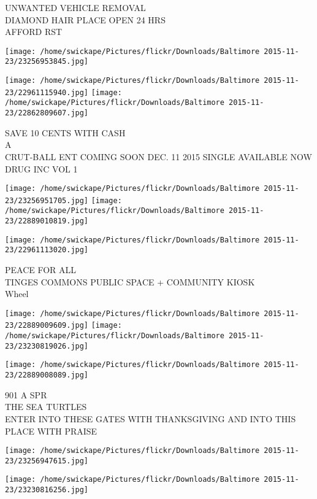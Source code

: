 \documentclass[10pt,letterpaper]{article}
\begin{document}
UNWANTED VEHICLE REMOVAL\\
DIAMOND HAIR PLACE OPEN 24 HRS\\
AFFORD RST\\
\pagebreak

\texttt{[image: /home/swickape/Pictures/flickr/Downloads/Baltimore 2015-11-23/23256953845.jpg]}

\vspace{0.25in}
\texttt{[image: /home/swickape/Pictures/flickr/Downloads/Baltimore 2015-11-23/22961115940.jpg]}
\texttt{[image: /home/swickape/Pictures/flickr/Downloads/Baltimore 2015-11-23/22862809607.jpg]}

SAVE 10 CENTS WITH CASH\\
A\\
CRUT{-}BALL ENT COMING SOON DEC. 11 2015 SINGLE AVAILABLE NOW DRUG INC VOL 1\\
\pagebreak

\texttt{[image: /home/swickape/Pictures/flickr/Downloads/Baltimore 2015-11-23/23256951705.jpg]}
\texttt{[image: /home/swickape/Pictures/flickr/Downloads/Baltimore 2015-11-23/22889010819.jpg]}

\vspace{0.25in}
\texttt{[image: /home/swickape/Pictures/flickr/Downloads/Baltimore 2015-11-23/22961113020.jpg]}

PEACE FOR ALL\\
TINGES COMMONS PUBLIC SPACE + COMMUNITY KIOSK\\
Wheel\\
\pagebreak

\texttt{[image: /home/swickape/Pictures/flickr/Downloads/Baltimore 2015-11-23/22889009609.jpg]}
\texttt{[image: /home/swickape/Pictures/flickr/Downloads/Baltimore 2015-11-23/23230819026.jpg]}

\texttt{[image: /home/swickape/Pictures/flickr/Downloads/Baltimore 2015-11-23/22889008089.jpg]}

901 A SPR\\
THE SEA TURTLES\\
ENTER INTO THESE GATES WITH THANKSGIVING AND INTO THIS PLACE WITH PRAISE\\
\pagebreak

\texttt{[image: /home/swickape/Pictures/flickr/Downloads/Baltimore 2015-11-23/23256947615.jpg]}

\vspace{0.25in}
\texttt{[image: /home/swickape/Pictures/flickr/Downloads/Baltimore 2015-11-23/23230816256.jpg]}
\end{document}
